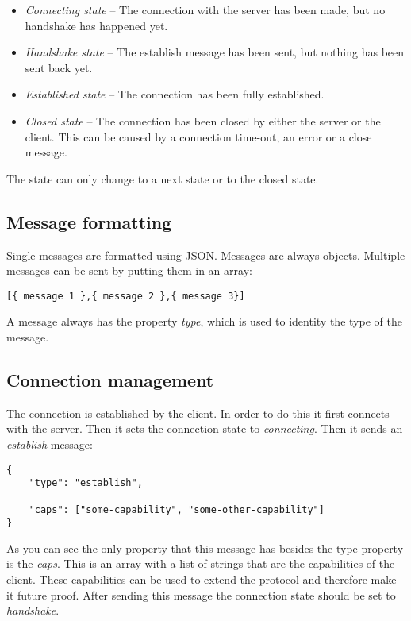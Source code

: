 \documentclass[11pt]{article}
\begin{document}
\begin{itemize}
\item \textit{Connecting state} -- The connection with the server has been made, but no handshake has happened yet.
\item \textit{Handshake state} -- The establish message has been sent, but nothing has been sent back yet.
\item \textit{Established state} -- The connection has been fully established.
\item \textit{Closed state} -- The connection has been closed by either the server or the client.
This can be caused by a connection time-out, an error or a close message.
\end{itemize}

The state can only change to a next state or to the closed state.

\subsection{Message formatting}

Single messages are formatted using JSON.
Messages are always objects.
Multiple messages can be sent by putting them in an array:

\begin{verbatim}
[{ message 1 },{ message 2 },{ message 3}]
\end{verbatim}

A message always has the property \textit{type}, which is used to identity the type of the message.

\subsection{Connection management}

The connection is established by the client.
In order to do this it first connects with the server.
Then it sets the connection state to \textit{connecting}.
Then it sends an \textit{establish} message:

\begin{verbatim}
{
    "type": "establish",

    "caps": ["some-capability", "some-other-capability"]
}
\end{verbatim}

As you can see the only property that this message has besides the type property is the \textit{caps}.
This is an array with a list of strings that are the capabilities of the client.
These capabilities can be used to extend the protocol and therefore make it future proof.
After sending this message the connection state should be set to \textit{handshake}.
\end{document}
